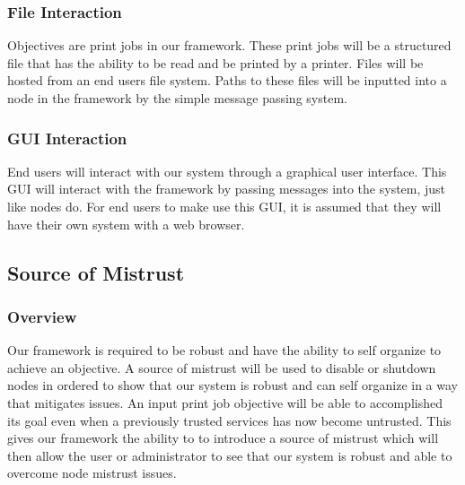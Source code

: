 \documentclass[draftclsnofoot, onecolumn, compsoc, 10pt]{IEEEtran}
\begin{document}
\subsubsection{File Interaction}
Objectives are print jobs in our framework. These print jobs will be a structured file that has the ability to be read and be printed by a printer. Files will be hosted from an end users file system. Paths to these files will be inputted into a node in the framework by the simple message passing system. 


\subsubsection{GUI Interaction}
End users will interact with our system through a graphical user interface. This GUI will interact with the framework by passing messages into the system, just like nodes do. For end users to make use this GUI, it is assumed that they will have their own system with a web browser.


\subsection{Source of Mistrust}
\subsubsection{Overview} 
Our framework is required to be robust and have the ability to self organize to achieve an objective. A source of mistrust will be used to disable or shutdown nodes in ordered to show that our system is robust and can self organize in a way that mitigates issues. An input print job objective will be able to accomplished its goal even when a previously trusted services has now become untrusted. This gives our framework the ability to to introduce a source of mistrust which will then allow the user or administrator to see that our system is robust and able to overcome node mistrust issues.
\end{document}

